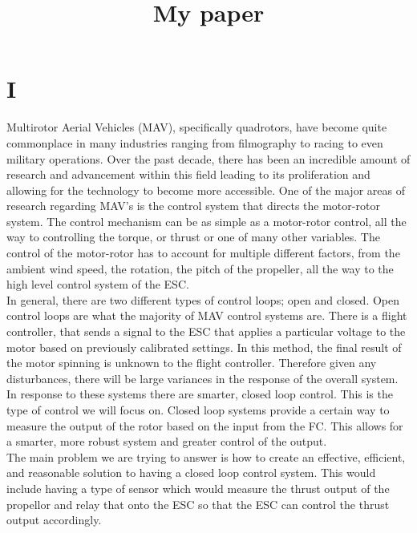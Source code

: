 \documentclass[twocolumn]{article}
\begin{document}
	\title{\begin{titlepage}
		My paper
	\end{titlepage}}

	\section{I}
	
	Multirotor Aerial Vehicles (MAV), specifically quadrotors, have become quite commonplace in many industries ranging from filmography to racing to even military operations. Over the past decade, there has been an incredible amount of research and advancement within this field leading to its proliferation and allowing for the technology to become more accessible. One of the major areas of research regarding MAV's is the control system that directs the motor-rotor system. The control mechanism can be as simple as a motor-rotor control, all the way to controlling the torque, or thrust or one of many other variables. The control of the motor-rotor has to account for multiple different factors, from the ambient wind speed, the rotation, the pitch of the propeller, all the way to the high level control system of the ESC. \\
	
	
	In general, there are two different types of control loops; open and closed. Open control loops are what the majority of MAV control systems are. There is a flight controller, that sends a signal to the ESC that applies a particular voltage to the motor based on previously calibrated settings. In this method, the final result of the motor spinning is unknown to the flight controller. Therefore given any disturbances, there will be large variances in the response of the overall system. In response to these systems there are smarter, closed loop control. This is the type of control we will focus on. Closed loop systems provide a certain way to measure the output of the rotor based on the input from the FC. This allows for a smarter, more robust system and greater control of the output. \\
	
	The main problem we are trying to answer is how to create an effective, efficient, and reasonable solution to having a closed loop control system. This would include having a type of sensor which would measure the thrust output of the propellor and relay that onto the ESC so that the ESC can control the thrust output accordingly.
	
\end{document}
